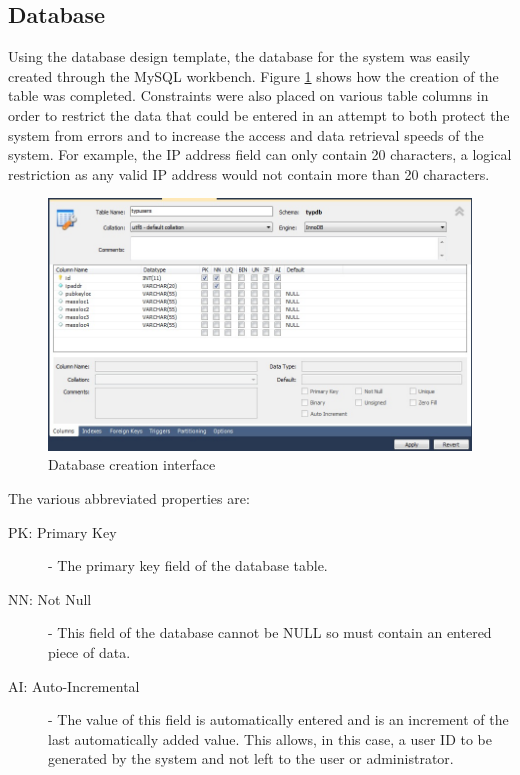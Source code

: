 \documentclass[a4paper,12pt]{report}
\begin{document}
\subsection{Database}

Using the database design template, the database for the system was easily created through the MySQL workbench. Figure \ref{fig:database1} shows how the creation of the table was completed. Constraints were also placed on various table columns in order to restrict the data that could be entered in an attempt to both protect the system from errors and to increase the access and data retrieval speeds of the system. For example, the IP address field can only contain 20 characters, a logical restriction as any valid IP address would not contain more than 20 characters. 

\begin{figure}[htb]
 \centering
 \includegraphics[scale=0.5]{images/screenshots/database1.jpg}
 \caption{Database creation interface}
 \label{fig:database1}
\end{figure}

The various abbreviated properties are:

\begin{description}
 \item[PK: Primary Key] - The primary key field of the database table.
 \item[NN: Not Null] - This field of the database cannot be NULL so must contain an entered piece of data.
 \item[AI: Auto-Incremental] - The value of this field is automatically entered and is an increment of the last automatically added value. This allows, in this case, a user ID to be generated by the system and not left to the user or administrator. 
\end{description}
\end{document}
